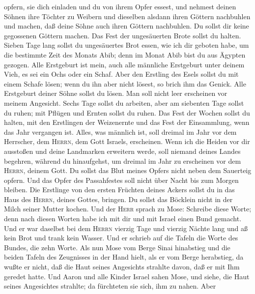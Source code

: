 opfern, sie dich einladen und du von ihrem Opfer essest, 
und nehmest deinen Söhnen ihre Töchter zu Weibern und dieselben alsdann
ihren Göttern nachbuhlen und machen, daß deine Söhne auch ihren Göttern
nachbuhlen.  Du sollst dir keine gegossenen Göttern
machen.  Das Fest der ungesäuerten Brote sollst du
halten. Sieben Tage lang sollst du ungesäuertes Brot essen, wie ich dir
geboten habe, um die bestimmte Zeit des Monats Abib; denn im Monat Abib
bist du aus Ägypten gezogen.  Alle Erstgeburt ist mein,
auch alle männliche Erstgeburt unter deinem Vieh, es sei ein Ochs oder
ein Schaf.  Aber den Erstling des Esels sollst du mit
einem Schafe lösen; wenn du ihn aber nicht lösest, so brich ihm das
Genick. Alle Erstgeburt deiner Söhne sollst du lösen. Man soll nicht
leer erscheinen vor meinem Angesicht.  Sechs Tage sollst
du arbeiten, aber am siebenten Tage sollst du ruhen; mit Pflügen und
Ernten sollst du ruhen.  Das Fest der Wochen sollst du
halten, mit den Erstlingen der Weizenernte und das Fest der Einsammlung,
wenn das Jahr vergangen ist.  Alles, was männlich ist,
soll dreimal im Jahr vor dem Herrscher, dem \textsc{Herrn}, dem Gott
Israels, erscheinen.  Wenn ich die Heiden vor dir
ausstoßen und deine Landmarken erweitern werde, soll niemand deines
Landes begehren, während du hinaufgehst, um dreimal im Jahr zu
erscheinen vor dem \textsc{Herrn}, deinem Gott.  Du
sollst das Blut meines Opfers nicht neben dem Sauerteig opfern. Und das
Opfer des Passahfestes soll nicht über Nacht bis zum Morgen bleiben.
 Die Erstlinge von den ersten Früchten deines Ackers
sollst du in das Haus des \textsc{Herrn}, deines Gottes, bringen. Du
sollst das Böcklein nicht in der Milch seiner Mutter kochen.
 Und der \textsc{Herr} sprach zu Mose: Schreibe diese
Worte; denn nach diesen Worten habe ich mit dir und mit Israel einen
Bund gemacht.  Und er war daselbst bei dem \textsc{Herrn}
vierzig Tage und vierzig Nächte lang und aß kein Brot und trank kein
Wasser. Und er schrieb auf die Tafeln die Worte des Bundes, die zehn
Worte.  Als nun Mose vom Berge Sinai hinabstieg und die
beiden Tafeln des Zeugnisses in der Hand hielt, als er vom Berge
herabstieg, da wußte er nicht, daß die Haut seines Angesichts strahlte
davon, daß er mit Ihm geredet hatte.  Und Aaron und alle
Kinder Israel sahen Mose, und siehe, die Haut seines Angesichtes
strahlte; da fürchteten sie sich, ihm zu nahen.  Aber
